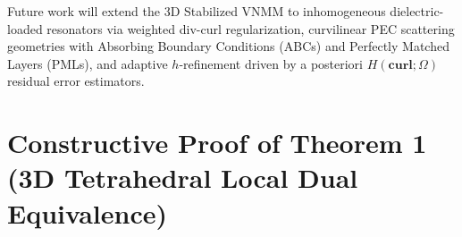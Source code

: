 \documentclass[preprint,12pt]{elsarticle}
\newcommand{\Hcurl}{H(\mathbf{curl};\Omega)}
\begin{document}
Future work will extend the 3D Stabilized VNMM to inhomogeneous dielectric-loaded resonators via weighted div-curl regularization, curvilinear PEC scattering geometries with Absorbing Boundary Conditions (ABCs) and Perfectly Matched Layers (PMLs), and adaptive $h$-refinement driven by a posteriori $\Hcurl$ residual error estimators.

\appendix

\section{Constructive Proof of Theorem 1 (3D Tetrahedral Local Dual Equivalence)}
\label{app:proof_equivalence_3d}
\end{document}
